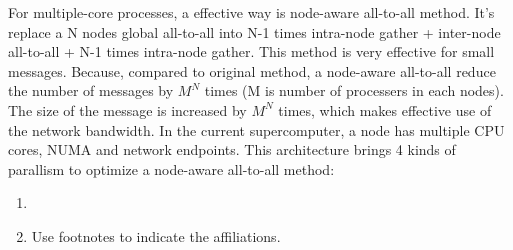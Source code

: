 For multiple-core processes, a effective way is node-aware all-to-all method.
It's replace a N nodes global all-to-all into N-1 times intra-node gather + inter-node all-to-all  + N-1 times intra-node gather.
This method is very effective for small messages.
Because, compared to original method, a node-aware all-to-all reduce the number of messages by $M^N$ times (M is number of processers in each nodes).
The size of the message is increased by $M^N$ times, which makes effective use of the network bandwidth.
In the current supercomputer, a node has multiple CPU cores, NUMA and network endpoints.
This architecture brings 4 kinds of parallism to optimize a node-aware all-to-all method:
\begin{enumerate}[(1)]
\item 
\item Use footnotes to indicate the affiliations.
\end{enumerate}